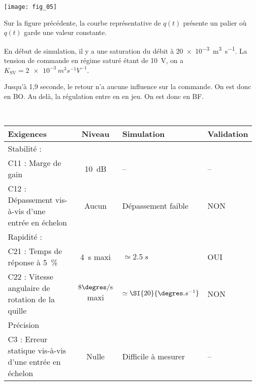 \begin{marginfigure}
\texttt{[image: fig\_05]}
\end{marginfigure}

Sur la figure précédente, la courbe représentative de $q(t)$ présente un palier où $q(t)$ garde une valeur constante.
\fi

\ifprof
\begin{corrige}
En début de simulation, il y a une saturation du débit à \SI{20e-3}{m^3 s^{-1}}. La tension de commande en régime saturé étant de \SI{10}{V}, on a $K_{\text{SV}} = \SI{2e-3}{m^3 s^{-1}V^{-1}}$.

Jusqu'à 1,9 seconde, le retour n'a aucune influence sur la commande. On est donc en BO. Au delà, la régulation entre en en jeu. On est donc en BF. 

\end{corrige}
\else
\fi

\ifprof
\begin{corrige} ~\\

\begin{center}
\begin{tabular}{|l|c|l|l|}
\hline
Exigences & Niveau & Simulation & Validation  \\
\hline\hline
Stabilité : & & & \\
C11 : Marge de gain & \SI{10}{dB} & -- & -- \\
C12 : Dépassement vis-à-vis d'une entrée en échelon & Aucun & Dépassement faible& NON \\
\hline
Rapidité :  & &&\\
C21 : Temps de réponse à 5\, \% & \SI{4}{s} maxi  & $\simeq \SI{2,5}{s}$& OUI\\
C22 : Vitesse angulaire de rotation de la quille & $8\degres/\text{s}$  maxi & $\simeq \SI{20}{\degres.s^{-1}}$&NON\\
\hline
Précision & &&\\
 C3 : Erreur statique vis-à-vis d'une entrée en échelon & Nulle &Difficile à mesurer & -- \\
\hline
\end{tabular}
\end{center}


\end{corrige}
\else
\fi

